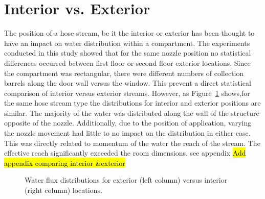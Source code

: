 \documentclass[12pt,oneside]{book}
\begin{document}
\section{Interior vs. Exterior}
The position of a hose stream, be it the interior or exterior has been thought to have an impact on water distribution within a compartment. The experiments conducted in this study showed that for the same nozzle position no statistical differences occurred between first floor or second floor exterior locations. Since the compartment was rectangular, there were different numbers of collection barrels along the door wall versus the window. This prevent a direct statistical comparison of interior versus exterior streams. However, as Figure~\ref{fig:Interior_vs_Exterior} shows,for the same hose stream type the distributions for interior and exterior positions are similar. The majority of the water was distributed along the wall of the structure opposite of the nozzle. Additionally, due to the position of application, varying the nozzle movement had little to no impact on the distribution in either case. This was directly related to momentum of the water the reach of the stream. The effective reach significantly exceeded the room dimensions.  see appendix \hl{Add appendix comparing interior \&exterior}

\begin{figure}[!ht]
\centering
{}
\caption[Interior vs Exterior Application]{Water flux distributions for exterior (left column) versus interior (right column) locations.}
\label{fig:Interior_vs_Exterior}
\end{figure}
\end{document}

